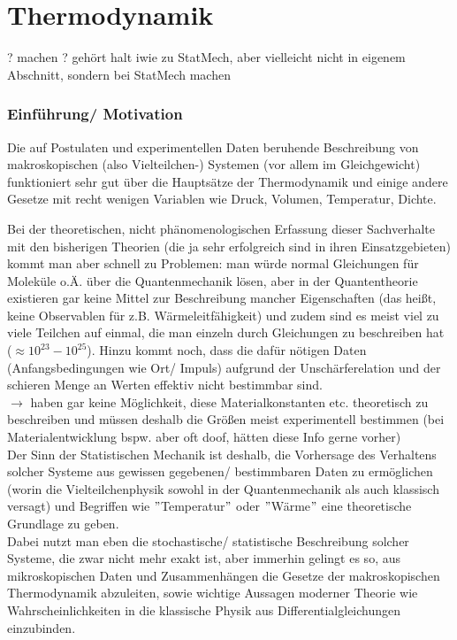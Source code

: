\documentclass[../KlassMech_main.tex]{subfiles}
\begin{document}
\setcounter{chapter}{3}

\chapter{Thermodynamik}
? machen ? gehört halt iwie zu StatMech, aber vielleicht nicht in eigenem Abschnitt, sondern bei StatMech machen


	\subsection{Einführung/ Motivation}
Die auf Postulaten und experimentellen Daten beruhende Beschreibung von makroskopischen (also Vielteilchen-) Systemen (vor allem im Gleichgewicht) funktioniert sehr gut über die Hauptsätze der Thermodynamik und einige andere Gesetze mit recht wenigen Variablen wie Druck, Volumen, Temperatur, Dichte.

Bei der theoretischen, nicht phänomenologischen Erfassung dieser Sachverhalte mit den bisherigen Theorien (die ja sehr erfolgreich sind in ihren Einsatzgebieten) kommt man aber schnell zu Problemen: man würde normal Gleichungen für Moleküle o.Ä. über die Quantenmechanik lösen, aber in der Quantentheorie existieren gar keine Mittel zur Beschreibung mancher Eigenschaften (das heißt, keine Observablen für z.B. Wärmeleitfähigkeit) und zudem sind es meist viel zu viele Teilchen auf einmal, die man einzeln durch Gleichungen zu beschreiben hat ($\approx 10^{23} - 10^{25}$). Hinzu kommt noch, dass die dafür nötigen Daten (Anfangsbedingungen wie Ort/ Impuls) aufgrund der Unschärferelation und der schieren Menge an Werten effektiv nicht bestimmbar sind. \medskip\\
$\rightarrow$ haben gar keine Möglichkeit, diese Materialkonstanten etc. theoretisch zu beschreiben und müssen deshalb die Größen meist experimentell bestimmen (bei Materialentwicklung bspw. aber oft doof, hätten diese Info gerne vorher)\\

Der Sinn der Statistischen Mechanik ist deshalb, die Vorhersage des Verhaltens solcher Systeme aus gewissen gegebenen/ bestimmbaren Daten zu ermöglichen (worin die Vielteilchenphysik sowohl in der Quantenmechanik als auch klassisch versagt) und Begriffen wie $"$Temperatur$"$ oder $"$Wärme$"$ eine theoretische Grundlage zu geben.\medskip\\
Dabei nutzt man eben die stochastische/ statistische Beschreibung solcher Systeme, die zwar nicht mehr exakt ist, aber immerhin gelingt es so, aus mikroskopischen Daten und Zusammenhängen die Gesetze der makroskopischen Thermodynamik abzuleiten, sowie wichtige Aussagen moderner Theorie wie Wahrscheinlichkeiten in die klassische Physik aus Differentialgleichungen einzubinden.
\end{document}
